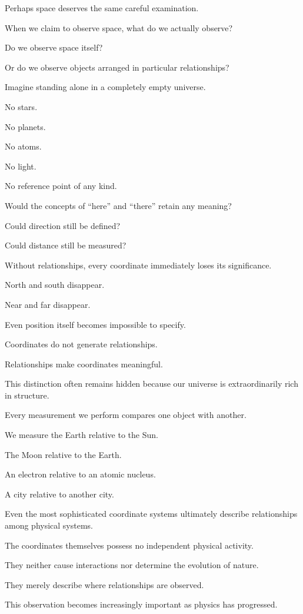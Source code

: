 Perhaps space deserves the same careful examination.

When we claim to observe space, what do we actually observe?

Do we observe space itself?

Or do we observe objects arranged in particular relationships?

Imagine standing alone in a completely empty universe.

No stars.

No planets.

No atoms.

No light.

No reference point of any kind.

Would the concepts of “here” and “there” retain any meaning?

Could direction still be defined?

Could distance still be measured?

Without relationships, every coordinate immediately loses its significance.

North and south disappear.

Near and far disappear.

Even position itself becomes impossible to specify.

Coordinates do not generate relationships.

Relationships make coordinates meaningful.

This distinction often remains hidden because our universe is extraordinarily rich in structure.

Every measurement we perform compares one object with another.

We measure the Earth relative to the Sun.

The Moon relative to the Earth.

An electron relative to an atomic nucleus.

A city relative to another city.

Even the most sophisticated coordinate systems ultimately describe relationships among physical systems.

The coordinates themselves possess no independent physical activity.

They neither cause interactions nor determine the evolution of nature.

They merely describe where relationships are observed.

This observation becomes increasingly important as physics has progressed.

